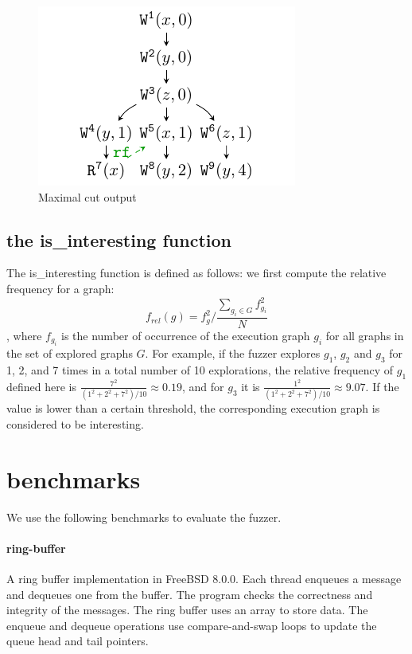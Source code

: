 \begin{figure}[htbp]
	\centering
	\includegraphics[scale=1]{figure/cuts/cut-maximal.pdf}
	\caption{Maximal cut output}
	\label{cut:maximal}
\end{figure}


\subsection{the is\_interesting function}
The is\_interesting function is defined as follows: we first compute the relative frequency for a graph:
\[f_{rel}(g) = f_g^2 / \frac{\sum_{g_i \in G} f_{g_i}^2}{N}\], where $f_{g_i}$ is the number of occurrence of the execution graph $g_i$ for all graphs in the set of explored graphs $G$. For example, if the fuzzer explores $g_1$, $g_2$ and $g_3$ for 1, 2, and 7 times in a total number of 10 explorations, the relative frequency of $g_1$ defined here is $\frac{7^2}{(1^2 + 2^2 + 7^2) / 10} \approx 0.19 $, and for $g_3$ it is $\frac{1^2}{(1^2 + 2^2 + 7^2) / 10} \approx 9.07 $. If the value is lower than a certain threshold, the corresponding execution graph is considered to be interesting.



\section{benchmarks}

We use the following benchmarks to evaluate the fuzzer.


\paragraph{ring-buffer} A ring buffer implementation in FreeBSD 8.0.0. Each thread enqueues a message and dequeues one from the buffer. The program checks the correctness and integrity of the messages. The ring buffer uses an array to store data. The enqueue and dequeue operations use compare-and-swap loops to update the queue head and tail pointers.

